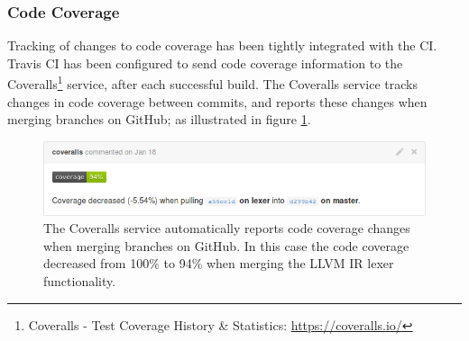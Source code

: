 
\subsubsection{Code Coverage}

Tracking of changes to code coverage has been tightly integrated with the CI. Travis CI has been configured to send code coverage information to the Coveralls\footnote{Coveralls - Test Coverage History \& Statistics: \url{https://coveralls.io/}} service, after each successful build. The Coveralls service tracks changes in code coverage between commits, and reports these changes when merging branches on GitHub; as illustrated in figure \ref{fig:coveralls}.

\begin{figure}[htbp]
	\begin{center}
		\includegraphics[width=\textwidth]{inc/coveralls.png}
		\caption{The Coveralls service automatically reports code coverage changes when merging branches on GitHub. In this case the code coverage decreased from 100\% to 94\% when merging the LLVM IR lexer functionality.}
		\label{fig:coveralls}
	\end{center}
\end{figure}
